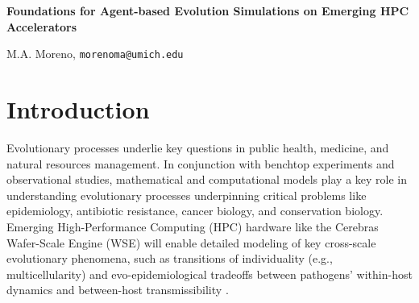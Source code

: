 

\begin{center}
\textbf{Foundations for Agent-based Evolution Simulations on Emerging HPC Accelerators}

M.A. Moreno, \texttt{morenoma@umich.edu}
\end{center}
\vspace{-2ex}
\section{Introduction}
Evolutionary processes underlie key questions in public health, medicine, and natural resources management.
In conjunction with benchtop experiments and observational studies, mathematical and computational models play a key role in understanding evolutionary processes underpinning critical problems like epidemiology, antibiotic resistance, cancer biology, and conservation biology.
Emerging High-Performance Computing (HPC) hardware like the Cerebras Wafer-Scale Engine (WSE) will enable detailed modeling of key cross-scale evolutionary phenomena, such as transitions of individuality (e.g., multicellularity) and evo-epidemiological tradeoffs between pathogens' within-host dynamics and between-host transmissibility \cite{goldsby2020major,schreiber2021evolutionary}.

